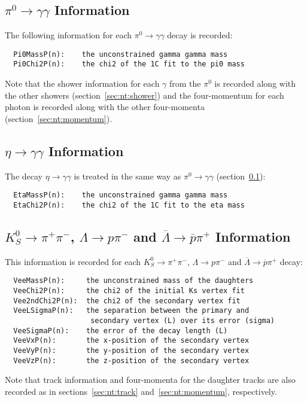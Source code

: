\documentclass[11pt,a4paper]{define/cepcnote}
\begin{document}
\subsection[$\pi^0\to\gamma\gamma$ Information]{\boldmath $\pi^0\to\gamma\gamma$ Information}
\label{sec:nt:pi0}

The following information for each $\pi^0\to\gamma\gamma$ decay is recorded:
\begin{verbatim}
  Pi0MassP(n):    the unconstrained gamma gamma mass
  Pi0Chi2P(n):    the chi2 of the 1C fit to the pi0 mass
\end{verbatim}
Note that the shower information for each $\gamma$ from the $\pi^0$ is recorded along with the other showers (section~\ref{sec:nt:shower}) and the four-momentum for each photon is recorded along with the other four-momenta (section~\ref{sec:nt:momentum}).

\subsection[$\eta\to\gamma\gamma$ Information]{\boldmath $\eta\to\gamma\gamma$ Information}
\label{sec:nt:eta}

The decay $\eta\to\gamma\gamma$ is treated in the same way as $\pi^0\to\gamma\gamma$ (section~\ref{sec:nt:pi0}):
\begin{verbatim}
  EtaMassP(n):    the unconstrained gamma gamma mass
  EtaChi2P(n):    the chi2 of the 1C fit to the eta mass
\end{verbatim}

\subsection[$K^0_S\to\pi^+\pi^-$, $\Lambda \to p\pi^-$ and $\overline{\Lambda}\to\overline{p}\pi^+$ Information]{\boldmath $K^0_S\to\pi^+\pi^-$, $\Lambda \to p\pi^-$ and $\overline{\Lambda}\to\overline{p}\pi^+$ Information}

This information is recorded for each $K^0_S\to\pi^+\pi^-$, $\Lambda \to p\pi^-$ and $\overline{\Lambda}\to\overline{p}\pi^+$ decay:
\begin{verbatim}
  VeeMassP(n):     the unconstrained mass of the daughters
  VeeChi2P(n):     the chi2 of the initial Ks vertex fit
  Vee2ndChi2P(n):  the chi2 of the secondary vertex fit
  VeeLSigmaP(n):   the separation between the primary and 
                    secondary vertex (L) over its error (sigma)
  VeeSigmaP(n):    the error of the decay length (L)
  VeeVxP(n):       the x-position of the secondary vertex
  VeeVyP(n):       the y-position of the secondary vertex
  VeeVzP(n):       the z-position of the secondary vertex
\end{verbatim}
Note that track information and four-momenta for the daughter tracks are also recorded as in sections~\ref{sec:nt:track} and~\ref{sec:nt:momentum}, respectively.
\end{document}
